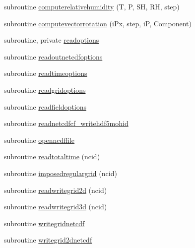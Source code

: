 \begin{DoxyCompactItemize}
\item 
subroutine \mbox{\hyperlink{namespacemodulenetcdfcf__2__hdf5mohid_a7f79a0cd0ca5a26cabb89d21e7a2daf4}{computerelativehumidity}} (T, P, SH, RH, step)
\item 
subroutine \mbox{\hyperlink{namespacemodulenetcdfcf__2__hdf5mohid_a849aa8add58ebd9a4fc70960b4af25fa}{computevectorrotation}} (i\+Px, step, iP, Component)
\item 
subroutine, private \mbox{\hyperlink{namespacemodulenetcdfcf__2__hdf5mohid_aa120ed50c203e49fe912874719cd402d}{readoptions}}
\item 
subroutine \mbox{\hyperlink{namespacemodulenetcdfcf__2__hdf5mohid_ae51ef08c6aac5023d3661f6ec659119a}{readoutnetcdfoptions}}
\item 
subroutine \mbox{\hyperlink{namespacemodulenetcdfcf__2__hdf5mohid_ab249ad2d3a887227db840c6a431fe4a4}{readtimeoptions}}
\item 
subroutine \mbox{\hyperlink{namespacemodulenetcdfcf__2__hdf5mohid_a7c8cc3d3916c4dc8bd05f9754fbc5421}{readgridoptions}}
\item 
subroutine \mbox{\hyperlink{namespacemodulenetcdfcf__2__hdf5mohid_a21d2fbdc24da139bc76ad03220d11dc9}{readfieldoptions}}
\item 
subroutine \mbox{\hyperlink{namespacemodulenetcdfcf__2__hdf5mohid_a3998ea5c718e38c4e1c63dcb93c8fdac}{readnetcdfcf\+\_\+writehdf5mohid}}
\item 
subroutine \mbox{\hyperlink{namespacemodulenetcdfcf__2__hdf5mohid_acf2bf806a4a00a849877321743f4ab04}{openncdffile}}
\item 
subroutine \mbox{\hyperlink{namespacemodulenetcdfcf__2__hdf5mohid_acc82dcd56265bba5ab4bdb98fd785e4b}{readtotaltime}} (ncid)
\item 
subroutine \mbox{\hyperlink{namespacemodulenetcdfcf__2__hdf5mohid_a9b6bf6f96a105d171c7c2487cabd5c51}{imposedregulargrid}} (ncid)
\item 
subroutine \mbox{\hyperlink{namespacemodulenetcdfcf__2__hdf5mohid_a676c74281acb5193758be5405b7e6310}{readwritegrid2d}} (ncid)
\item 
subroutine \mbox{\hyperlink{namespacemodulenetcdfcf__2__hdf5mohid_a80bb913f46008900376c9030ad45a641}{readwritegrid3d}} (ncid)
\item 
subroutine \mbox{\hyperlink{namespacemodulenetcdfcf__2__hdf5mohid_ab80bf2060093fbfbc2ca158f9f70adc3}{writegridnetcdf}}
\item 
subroutine \mbox{\hyperlink{namespacemodulenetcdfcf__2__hdf5mohid_ae7c9e3dcc5e862ce4bcb8836b9f03f77}{writegrid2dnetcdf}}

\end{DoxyCompactItemize}
